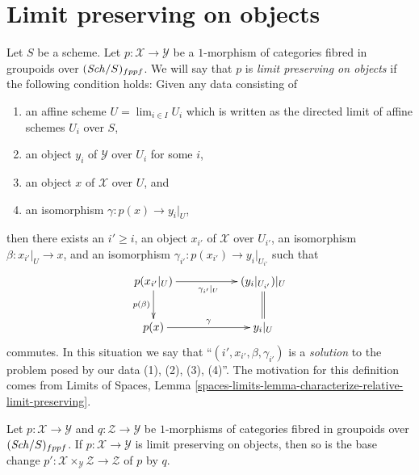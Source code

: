 \section{Limit preserving on objects}
\label{section-limit-preserving}

\noindent
Let $S$ be a scheme. Let $p : \mathcal{X} \to \mathcal{Y}$ be a $1$-morphism
of categories fibred in groupoids over $(\mathit{Sch}/S)_{fppf}$. We will say that
$p$ is {\it limit preserving on objects} if the following condition holds:
Given any data consisting of
\begin{enumerate}
\item an affine scheme $U = \lim_{i \in I} U_i$ which is written as the
directed limit of affine schemes $U_i$ over $S$,
\item an object $y_i$ of $\mathcal{Y}$ over $U_i$ for some $i$,
\item an object $x$ of $\mathcal{X}$ over $U$, and
\item an isomorphism $\gamma : p(x) \to y_i|_U$,
\end{enumerate}
then there exists an $i' \geq i$, an object $x_{i'}$ of
$\mathcal{X}$ over $U_{i'}$, an isomorphism
$\beta : x_{i'}|_U \to x$, and an isomorphism
$\gamma_{i'} : p(x_{i'}) \to y_i|_{U_{i'}}$
such that
\begin{equation}
\label{equation-limit-preserving}
\vcenter{
\xymatrix{
p(x_{i'}|_U) \ar[d]_{p(\beta)} \ar[rr]_{\gamma_{i'}|_U} & &
(y_i|_{U_{i'}})|_U \ar@{=}[d] \\
p(x) \ar[rr]^\gamma & & y_i|_U
}
}
\end{equation}
commutes. In this situation we say that ``$(i', x_{i'}, \beta, \gamma_{i'})$
is a {\it solution} to the problem posed by our data (1), (2), (3), (4)''.
The motivation for this definition comes from
Limits of Spaces,
Lemma \ref{spaces-limits-lemma-characterize-relative-limit-preserving}.

\begin{lemma}
\label{lemma-base-change-limit-preserving}
Let $p : \mathcal{X} \to \mathcal{Y}$ and $q : \mathcal{Z} \to \mathcal{Y}$
be $1$-morphisms of categories fibred in groupoids over $(\mathit{Sch}/S)_{fppf}$.
If $p : \mathcal{X} \to \mathcal{Y}$ is limit preserving on objects, then so
is the base change
$p' : \mathcal{X} \times_\mathcal{Y} \mathcal{Z} \to \mathcal{Z}$
of $p$ by $q$.
\end{lemma}

